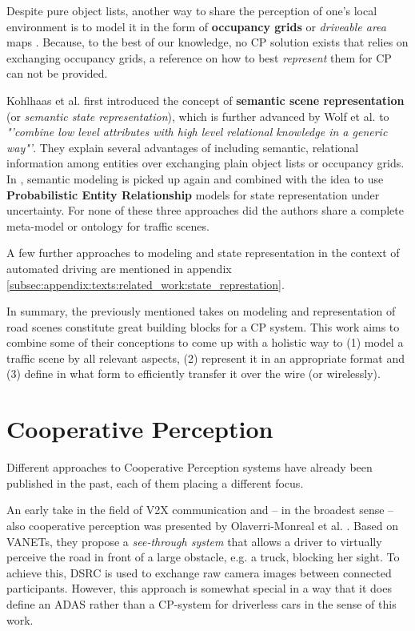Despite pure object lists, another way to share the perception of one's local environment is to model it in the form of \textbf{occupancy grids} or \textit{driveable area} maps \cite{pieringermodellierung}. Because, to the best of our knowledge, no CP solution exists that relies on exchanging occupancy grids, a reference on how to best \textit{represent} them for CP can not be provided.

Kohlhaas et al. \cite{Kohlhaas2014} first introduced the concept of \textbf{semantic scene representation} (or \textit{semantic state representation}), which is further advanced by Wolf et al. \cite{Wolf2018} to \textit{"'combine low level attributes with high level relational knowledge in a generic way"'}. They explain several advantages of including semantic, relational information among entities over exchanging plain object lists or occupancy grids. In \cite{Petrich2018}, semantic modeling is picked up again and combined with the idea to use \textbf{Probabilistic Entity Relationship} models for state representation under uncertainty. For none of these three approaches did the authors share a complete meta-model or ontology for traffic scenes.

A few further approaches to modeling and state representation in the context of automated driving are mentioned in appendix \cref{subsec:appendix:texts:related_work:state_represtation}.
\par
\bigskip

In summary, the previously mentioned takes on modeling and representation of road scenes constitute great building blocks for a CP system. This work aims to combine some of their conceptions to come up with a holistic way to (1) model a traffic scene by all relevant aspects, (2) represent it in an appropriate format and (3) define in what form to efficiently transfer it over the wire (or wirelessly). 

\section{Cooperative Perception}
\label{sec:related_work:cooperative_perception}
Different approaches to Cooperative Perception systems have already been published in the past, each of them placing a different focus.
\par
\bigskip

An early take in the field of V2X communication and – in the broadest sense – also cooperative perception was presented by Olaverri-Monreal et al. \cite{Olaverri-Monreal2010}. Based on VANETs, they propose a \textit{see-through system} that allows a driver to virtually perceive the road in front of a large obstacle, e.g. a truck, blocking her sight. To achieve this, DSRC is used to exchange raw camera images between connected participants. However, this approach is somewhat special in a way that it does define an ADAS rather than a CP-system for driverless cars in the sense of this work.
\par
\bigskip

